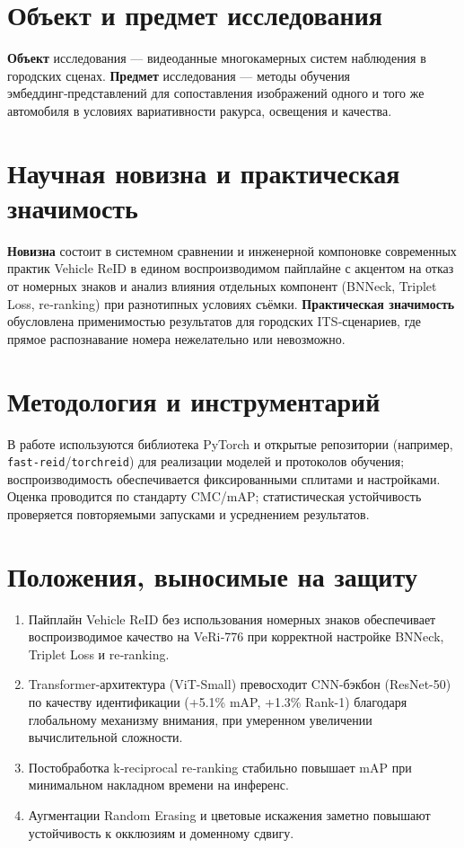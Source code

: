 \section{Объект и предмет исследования}
\textbf{Объект} исследования — видеоданные многокамерных систем наблюдения в городских сценах. \textbf{Предмет} исследования — методы обучения эмбеддинг‑представлений для сопоставления изображений одного и того же автомобиля в условиях вариативности ракурса, освещения и качества.

\section{Научная новизна и практическая значимость}
\textbf{Новизна} состоит в системном сравнении и инженерной компоновке современных практик Vehicle ReID в едином воспроизводимом пайплайне с акцентом на отказ от номерных знаков и анализ влияния отдельных компонент (BNNeck, Triplet Loss, re‑ranking) при разнотипных условиях съёмки. \textbf{Практическая значимость} обусловлена применимостью результатов для городских ITS‑сценариев, где прямое распознавание номера нежелательно или невозможно.

\section{Методология и инструментарий}
В работе используются библиотека PyTorch и открытые репозитории (например, \texttt{fast-reid}/\texttt{torchreid}) для реализации моделей и протоколов обучения; воспроизводимость обеспечивается фиксированными сплитами и настройками. Оценка проводится по стандарту CMC/mAP; статистическая устойчивость проверяется повторяемыми запусками и усреднением результатов.

\section{Положения, выносимые на защиту}
\begin{enumerate}
  \item Пайплайн Vehicle ReID без использования номерных знаков обеспечивает воспроизводимое качество на VeRi‑776 при корректной настройке BNNeck, Triplet Loss и re‑ranking.
  \item Transformer-архитектура (ViT-Small) превосходит CNN-бэкбон (ResNet-50) по качеству идентификации (+5.1\% mAP, +1.3\% Rank-1) благодаря глобальному механизму внимания, при умеренном увеличении вычислительной сложности.
  \item Постобработка k‑reciprocal re‑ranking стабильно повышает mAP при минимальном накладном времени на инференс.
  \item Аугментации Random Erasing и цветовые искажения заметно повышают устойчивость к окклюзиям и доменному сдвигу.
\end{enumerate}

